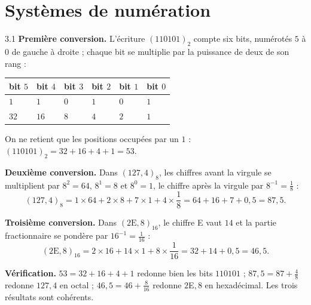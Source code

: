 \clearpage
\chapter{Systèmes de numération}

\begin{corrige}{3.1}
\textbf{Première conversion.} L'écriture $(110101)_2$ compte six bits, numérotés $5$ à $0$ de gauche à droite ; chaque bit se multiplie par la puissance de deux de son rang :
\begin{center}
\begin{tabular}{C{1.5cm}C{1.5cm}C{1.5cm}C{1.5cm}C{1.5cm}C{1.5cm}}
\toprule
{}bit $5$ & bit $4$ & bit $3$ & bit $2$ & bit $1$ & bit $0$ \\
\midrule
$1$ & $1$ & $0$ & $1$ & $0$ & $1$ \\
$32$ & $16$ & $8$ & $4$ & $2$ & $1$ \\
\bottomrule
\end{tabular}
\end{center}
On ne retient que les positions occupées par un $1$ : $(110101)_2 = 32 + 16 + 4 + 1 = 53$.

\textbf{Deuxième conversion.} Dans $(127{,}4)_8$, les chiffres avant la virgule se multiplient par $8^2 = 64$, $8^1 = 8$ et $8^0 = 1$, le chiffre après la virgule par $8^{-1} = \frac{1}{8}$ :
\[
(127{,}4)_8 = 1 \times 64 + 2 \times 8 + 7 \times 1 + 4 \times \frac{1}{8} = 64 + 16 + 7 + 0{,}5 = 87{,}5.
\]

\textbf{Troisième conversion.} Dans $(2\mathrm{E}{,}8)_{16}$, le chiffre E vaut $14$ et la partie fractionnaire se pondère par $16^{-1} = \frac{1}{16}$ :
\[
(2\mathrm{E}{,}8)_{16} = 2 \times 16 + 14 \times 1 + 8 \times \frac{1}{16} = 32 + 14 + 0{,}5 = 46{,}5.
\]

\textbf{Vérification.} $53 = 32 + 16 + 4 + 1$ redonne bien les bits $110101$ ; $87{,}5 = 87 + \frac{4}{8}$ redonne $127{,}4$ en octal ; $46{,}5 = 46 + \frac{8}{16}$ redonne $2$E$,8$ en hexadécimal. Les trois résultats sont cohérents.
\end{corrige}

